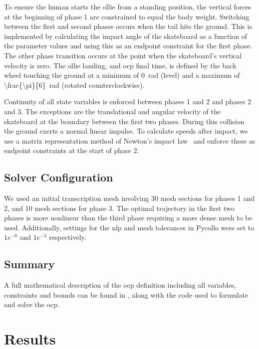 \documentclass[default,iicol]{sn-jnl}
\begin{document}
To ensure the human starts the ollie from a standing position, the vertical forces at the beginning of phase 1 are constrained to equal the body weight.
Switching between the first and second phases occurs when the tail hits the ground.
This is implemented by calculating the impact angle of the skateboard as a function of the parameter values and using this as an endpoint constraint for the first phase.
The other phase transition occurs at the point when the skateboard's vertical velocity is zero.
The ollie landing, and \gls{ocp} final time, is defined by the back wheel touching the ground at a minimum of \SI{0}{\radian} (level) and a maximum of \SI[parse-numbers = false, number-math-rm = \ensuremath]{\frac{\pi}{6}}{\radian} (rotated counterclockwise).

Continuity of all state variables is enforced between phases 1 and 2 and phases 2 and 3. The exceptions are the translational and angular velocity of the skateboard at the boundary between the first two phases. During this collision the ground exerts a normal linear impulse. To calculate speeds after impact, we use a matrix representation method of Newton's impact law~\cite{vallery_heike_advanced_2018} and enforce these as endpoint constraints at the start of phase 2.


\subsection{Solver Configuration}\label{s_settings}
We used an initial transcription mesh involving 30 mesh sections for phases 1 and 2, and 10 mesh sections for phase 3. The optimal trajectory in the first two phases is more nonlinear than the third phase requiring a more dense mesh to be used.
Additionally, settings for the \gls{nlp} and mesh tolerances in Pycollo were set to $1e^{-8}$ and $1e^{-3}$ respectively.

\subsection{Summary}\label{s_summary}
A full mathematical description of the \gls{ocp} definition including all variables, constraints and bounds can be found in \cite{heinen_optimal_2022}, along with the code used to formulate and solve the \gls{ocp}.


\section{Results}
\end{document}
